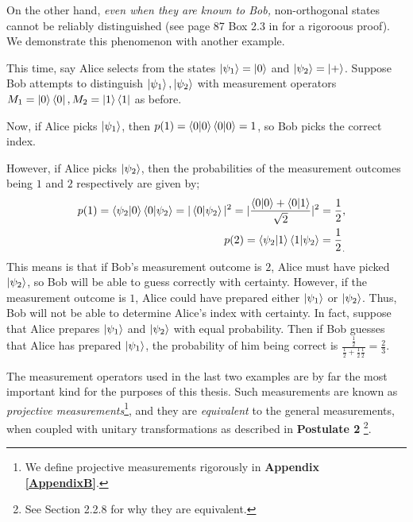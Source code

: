 On the other hand, {\emph{even when they are known to Bob,}} non-orthogonal states cannot be reliably distinguished (see page 87 Box 2.3 in \cite{Nielsen} for a rigoroous proof).  We demonstrate this phenomenon with another example.
\begin{example} \label{example: non-orthogonal states for measurements}
This time, say Alice selects from the states $\ket{\psi_1}=\ket{0}$ and  $\ket{\psi_2}=\ket{+}$. Suppose Bob attempts to distinguish $\ket{\psi_1}, \ket{\psi_2}$ with measurement operators $M_1=\ket{0}\bra{0}, M_2=\ket{1}\bra{1}$ as before.

Now, if Alice picks $\ket{\psi_1}$, then $p(1)=\braket{0 |0}\braket{0|0}=1$, so Bob picks the correct index. 

However, if Alice picks $\ket{\psi_2}$, then the probabilities of the measurement outcomes being $1$ and $2$ respectively are given by;
\begin{eqnarray}
    & &p(1)=\braket{\psi_2|0}\braket{0|\psi_2}=|\braket{0|\psi_2}|^2=|\frac{\braket{0|0}+\braket{0|1}}{\sqrt{2}}|^2=\frac{1}{2},\\
    & &p(2)=\braket{\psi_2|1}\braket{1|\psi_2}={\frac{1}{2}}_.
\end{eqnarray}
This means is that if Bob's measurement outcome is $2$, Alice must have picked $\ket{\psi_2}$, so Bob will be able to guess correctly with certainty. However, if the measurement outcome is $1$, Alice could have prepared either $\ket{\psi_1}$ or $\ket{\psi_2}$.  Thus, Bob will not be able to determine Alice's index with certainty.  In fact, suppose that Alice prepares $\ket{\psi_1}$ and $\ket{\psi_2}$ with equal probability.  Then if Bob guesses that Alice has prepared $\ket{\psi_1}$, the probability of him being correct is $\frac{\frac{1}{2}}{\frac{1}{2}+\frac{1}{2}\frac{1}{2}}=\frac{2}{3}$.
\end{example}


\label{subsection:projective measurement}
The measurement operators used in the last two examples are by far the most important kind for the purposes of this thesis.  Such measurements are known as \textit{projective measurements}\footnote{We define projective measurements rigorously in \textbf{Appendix \ref{AppendixB}}.}, and they are \textit{equivalent} to the general measurements, when coupled with unitary transformations as described in {\bf{Postulate 2}} \footnote{See \cite{Nielsen} Section 2.2.8 for why they are equivalent.}. 


